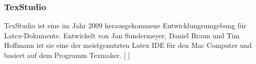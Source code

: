 \documentclass[FIPLY_base.tex]{subfiles}
\begin{document}
	\subsubsection{TexStudio}
	TexStudio ist eine im Jahr 2009 herausgekommene Entwicklungsumgebung für Latex-Dokumente. Entwickelt von Jan Sundermeyer, Daniel Braun und Tim Hoffmann ist sie eine der meistgenutzten Latex IDE für den Mac Computer und basiert auf dem Programm Texmaker.
	[ \cite{texstudio}]   
\end{document}
